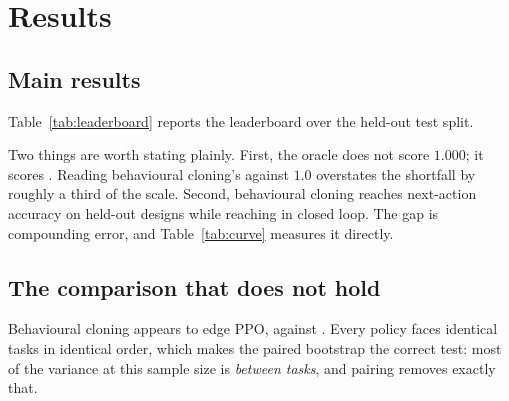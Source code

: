 \documentclass{article}
\begin{document}
\section{Results}\label{sec:results}

\subsection{Main results}

Table~\ref{tab:leaderboard} reports the leaderboard over the held-out test
split.

\begin{table}[t]
\centering

\caption{KAIROS-CAD-v1, held-out test split.
$^\dagger$Oracle replay is not a policy: it replays the ground-truth expert
through the action codec, so its score is the \emph{ceiling}, and the gap
between it and $1.000$ measures what the codec and the target encoding cannot
express.}
\label{tab:leaderboard}
\end{table}

Two things are worth stating plainly. First, the oracle does not score
$1.000$; it scores \OracleCeiling{}. Reading behavioural cloning's
\BCProgress{} against $1.0$ overstates the shortfall by roughly a third of the
scale. Second, behavioural cloning reaches \BCHeldOutAccuracy{} next-action
accuracy on held-out designs while reaching \BCProgress{} in closed loop. The
gap is compounding error, and Table~\ref{tab:curve} measures it directly.

\begin{table}[t]
\centering

\caption{Success against difficulty. $k$ is the number of trailing actions the
policy must supply; the expert prefix is everything before it, so larger $k$ is
harder. Behavioural cloning holds up when one action remains and has collapsed
by eight.}
\label{tab:curve}
\end{table}

\subsection{The comparison that does not hold}

Behavioural cloning appears to edge PPO, \BCProgress{} against \PPOProgress{}.
Every policy faces identical tasks in identical order, which makes the paired
bootstrap the correct test: most of the variance at this sample size is
\emph{between tasks}, and pairing removes exactly that.
\end{document}
